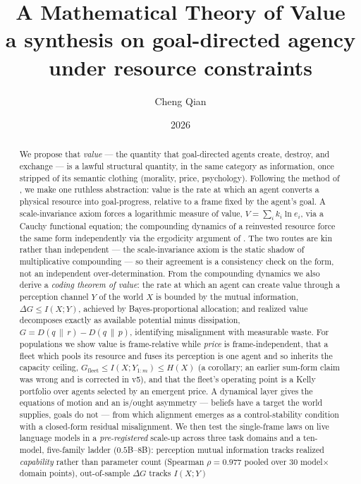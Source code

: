 \documentclass[11pt]{article}
\title{\bf A Mathematical Theory of Value\\[4pt]
{\large\normalfont a synthesis on goal-directed agency under resource constraints}}
\author{Cheng Qian}
\date{2026}
\theoremstyle{plain}
\theoremstyle{definition}
\theoremstyle{remark}
\newcommand{\KL}[2]{D\!\left(#1\,\|\,#2\right)}
\newcommand{\I}{I}
\begin{document}
\maketitle

\begin{abstract}
We propose that \emph{value} --- the quantity that goal-directed agents create, destroy, and exchange --- is a
lawful structural quantity, in the same category as information, once stripped of its semantic clothing
(morality, price, psychology). Following the method of \citet{shannon1948}, we make one ruthless abstraction:
value is the rate at which an agent converts a physical resource into goal-progress, relative to a frame fixed
by the agent's goal. A scale-invariance axiom forces a logarithmic measure of value, $V=\sum_i k_i\ln e_i$, via a Cauchy
functional equation; the compounding dynamics of a reinvested resource force the same form independently via
the ergodicity argument of \citet{peters2019}. The two routes are kin rather than independent --- the
scale-invariance axiom is the static shadow of multiplicative compounding --- so their agreement is a
consistency check on the form, not an independent over-determination. From the compounding dynamics we also derive a \emph{coding theorem of value}: the rate at which an agent can create value through a perception channel $Y$ of
the world $X$ is bounded by the mutual information, $\Delta G \le \I(X;Y)$, achieved by Bayes-proportional
allocation; and realized value decomposes exactly as available potential minus dissipation,
$G=\KL{q}{r}-\KL{q}{p}$, identifying misalignment with measurable waste. For populations we show value is
frame-relative while \emph{price} is frame-independent, that a fleet which pools its resource and fuses its
perception is one agent and so inherits the capacity ceiling, $G_{\mathrm{fleet}}\le \I(X;Y_{1:m})\le H(X)$ (a
corollary; an earlier sum-form claim was wrong and is corrected in v5), and that the fleet's operating point is a Kelly portfolio
over agents selected by an emergent price. A dynamical layer gives the equations of motion and an
is/ought asymmetry --- beliefs have a target the world supplies, goals do not --- from which alignment emerges
as a control-stability condition with a closed-form residual misalignment. We then test the single-frame laws on
live language models in a \emph{pre-registered} scale-up across three task domains and a ten-model, five-family
ladder ($0.5$B--$8$B): perception mutual information tracks realized \emph{capability} rather than parameter count
(Spearman $\rho = 0.977$ pooled over 30 model$\times$domain points), out-of-sample $\Delta G$ tracks $\I(X;Y)$

\end{abstract}
\end{document}
